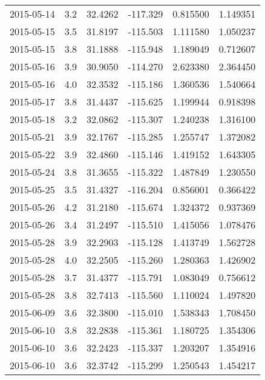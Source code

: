 \begin{tabular}{lrrrrr}
2015-05-14 &       3.2 &  32.4262 &  -117.329 &         0.815500 &         1.149351 \\
2015-05-15 &       3.5 &  31.8197 &  -115.503 &         1.111580 &         1.050237 \\
2015-05-15 &       3.8 &  31.1888 &  -115.948 &         1.189049 &         0.712607 \\
2015-05-16 &       3.9 &  30.9050 &  -114.270 &         2.623380 &         2.364450 \\
2015-05-16 &       4.0 &  32.3532 &  -115.186 &         1.360536 &         1.540664 \\
2015-05-17 &       3.8 &  31.4437 &  -115.625 &         1.199944 &         0.918398 \\
2015-05-18 &       3.2 &  32.0862 &  -115.307 &         1.240238 &         1.316100 \\
2015-05-21 &       3.9 &  32.1767 &  -115.285 &         1.255747 &         1.372082 \\
2015-05-22 &       3.9 &  32.4860 &  -115.146 &         1.419152 &         1.643305 \\
2015-05-24 &       3.8 &  31.3655 &  -115.322 &         1.487849 &         1.230550 \\
2015-05-25 &       3.5 &  31.4327 &  -116.204 &         0.856001 &         0.366422 \\
2015-05-26 &       4.2 &  31.2180 &  -115.674 &         1.324372 &         0.937369 \\
2015-05-26 &       3.4 &  31.2497 &  -115.510 &         1.415056 &         1.078476 \\
2015-05-28 &       3.9 &  32.2903 &  -115.128 &         1.413749 &         1.562728 \\
2015-05-28 &       4.0 &  32.2505 &  -115.260 &         1.280363 &         1.426902 \\
2015-05-28 &       3.7 &  31.4377 &  -115.791 &         1.083049 &         0.756612 \\
2015-05-28 &       3.8 &  32.7413 &  -115.560 &         1.110024 &         1.497820 \\
2015-06-09 &       3.6 &  32.3800 &  -115.010 &         1.538343 &         1.708450 \\
2015-06-10 &       3.8 &  32.2838 &  -115.361 &         1.180725 &         1.354306 \\
2015-06-10 &       3.6 &  32.2423 &  -115.337 &         1.203207 &         1.354916 \\
2015-06-10 &       3.6 &  32.3742 &  -115.299 &         1.250543 &         1.454217 \\

\end{tabular}
